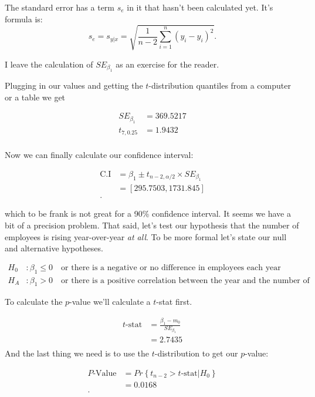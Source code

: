 \documentclass[letterpaper]{article}
\theoremstyle{definition}
\begin{document}
The standard error has a term $s_e$ in it that hasn't been calculated yet. It's formula
is:
\[
s_{e} = s_{y|x} = \sqrt{ \frac{1}{n-2} \sum_{i=1}^{n}(y_{i}-\hat{y}_{i})^{2} }
.\] 

I leave the calculation of $SE_{\beta_1}$ as an exercise for the reader.

Plugging in our values and getting the $t$-distribution quantiles from a computer or a
table we get

\begin{align}
	SE_{\beta_1}&= 369.5217 \\
	t_{7, 0.25} &= 1.9432 \\
\end{align}

Now we can finally calculate our confidence interval:

\begin{align*}
\text{C.I}&=  \beta_1 \pm t_{n-2, \alpha / 2} \times SE_{\beta_1}\\
	  &= [295.7503, 1731.845] \\
.\end{align*}

which to be frank is not great for a 90\% confidence interval. It seems we have a bit of a
precision problem. That said, let's test our hypothesis that the number of employees is
rising year-over-year \emph{at all}. To be more formal let's state our null and
alternative hypotheses.

\begin{align*}
	H_0&: \beta_1 \le   0 \quad \text{or there is a negative or no difference in employees each year}\\
	H_A&: \beta_1 > 0 \quad \text{or there is a positive correlation between the year and
	the number of employees.}
\end{align*}

To calculate the $p$-value we'll calculate a $t$-stat first.

\begin{align}
	t \text{-stat} &= \frac{\beta_1 - m_0}{SE_{\beta_1}} \\
	&= 2.7435 \\
\end{align}
And the last thing we need is to use the $t$-distribution to get our $p$-value:

\begin{align*}
	P\text{-Value} &= Pr \left\{ t_{n-2} > t \text{-stat} | H_0 \right\}  \\
	&= 0.0168 \\
.\end{align*}
\end{document}
